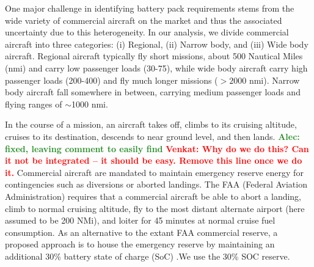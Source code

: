 \documentclass{achemso}
\newcommand{\vv}[1]{{\textbf{\textcolor{red}{Venkat: #1}}}}
\newcommand{\ab}[1]{{\textbf{\textcolor{ForestGreen}{Alec: #1}}}}
\begin{document}
One major challenge in identifying battery pack requirements stems from the wide variety of commercial aircraft on the market and thus the associated uncertainty due to this heterogeneity. In our analysis, we divide commercial aircraft into three categories: (i) Regional, (ii) Narrow body, and (iii) Wide body aircraft. Regional aircraft typically fly short missions, about 500 Nautical Miles (nmi) and carry low passenger loads (30-75), while wide body aircraft carry high passenger loads (200-400) and fly much longer missions ($>2000 $ nmi). Narrow body aircraft fall somewhere in between, carrying medium passenger loads and flying ranges of $\sim$1000 nmi. 




In the course of a mission, an aircraft takes off, climbs to its cruising altitude, cruises to its destination, descends to near ground level, and then lands\cite{Roskam}. \ab{fixed, leaving comment to easily find} \vv{Why do we do this?  Can it not be integrated -- it should be easy.  Remove this line once we do it.} Commercial aircraft are mandated to maintain emergency reserve energy for contingencies such as diversions or aborted landings. The FAA (Federal Aviation Administration) requires that a commercial aircraft be able to abort a landing, climb to normal cruising altitude, fly to the most distant alternate airport (here assumed to be 200 NMi), and loiter for 45 minutes at normal cruise fuel consumption.\cite{FAAreserve} As an alternative to the extant FAA commercial reserve, a proposed approach is to house the emergency reserve by maintaining an additional 30\% battery state of charge (SoC) \cite{GNADT20191}.We use the 30\% SOC reserve.
\end{document}
